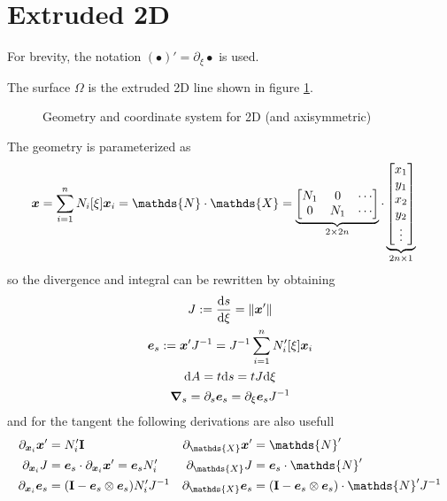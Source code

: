 \documentclass[a4paper,11pt]{article}
\renewcommand{\to}[1]{\text{\boldmath $#1$}} %
\newcommand{\ts}[1]{\text{\boldmath $\mathrm{#1}$}} %
\newcommand{\uv}[1]{\mathds{#1}}
\newcommand{\um}[1]{\mathds{#1}}
\newcommand{\intd}[1]{\mathrm{d}#1}
\newcommand{\pderiv}[2]{\partial_{#2} #1}
\newcommand{\dderiv}[2]{\frac{\mathrm{d}#1}{\mathrm{d}#2}}
\newcommand{\norm}[1]{\left\lVert{#1}\right\rVert}
\newcommand{\defeq}{:=}
\begin{document}
\section{Extruded 2D}
For brevity, the notation $(\bullet)' = \pderiv{\bullet}{\xi}$ is used.

The surface $\Omega$ is the extruded 2D line shown in figure \ref{fig:extruded}.
\begin{figure}[htpb]
 \centering
 \caption{Geometry and coordinate system for 2D (and axisymmetric)}
 \label{fig:extruded}
\end{figure}

The geometry is parameterized as
\begin{align}
 \to x &= \sum_{i=1}^n N_i[\xi]\to x_i
  = \um N \cdot \uv X
  = \underbrace{\begin{bmatrix}N_1 & 0 & \cdots\\ 0 & N_1 & \cdots \end{bmatrix}}_{2\times 2n}\cdot \underbrace{\begin{bmatrix}x_1\\y_1\\x_2\\y_2\\ \vdots\end{bmatrix}}_{2n\times 1}
\end{align}
so the divergence and integral can be rewritten by obtaining
\begin{gather}
 J \defeq \dderiv{s}{\xi} = \norm{\to x'}\\
 \to e_s \defeq \to x' J^{-1} = J^{-1}\sum_{i=1}^n N_i'[\xi] \to x_i\\
 \intd A = t \intd s = t J \intd \xi     \label{eq:intdA_2d}\\
 \to \nabla_s = \pderiv{}{s}\to e_s = \pderiv{}{\xi}\to e_s J^{-1}    \label{eq:nabla_s_2d}
\end{gather}
and for the tangent the following derivations are also usefull
\begin{align}
 \pderiv{\to x'}{\to x_i} &= N_i' \ts I & \pderiv{\to x'}{\uv X} &= \um N'\\
 \pderiv{J}{\to x_i} &= \to e_s \cdot \pderiv{\to x'}{\to x_i} = \to e_s N_i'  & \pderiv{J}{\uv X} &= \to e_s\cdot \um N' \\
 \pderiv{\to e_s}{\to x_i} &= (\ts I - \to e_s\otimes\to e_s)N_i' J^{-1} &  \pderiv{\to e_s}{\uv X} &= (\ts I - \to e_s\otimes \to e_s)\cdot \um N' J^{-1}
\end{align}
\end{document}
